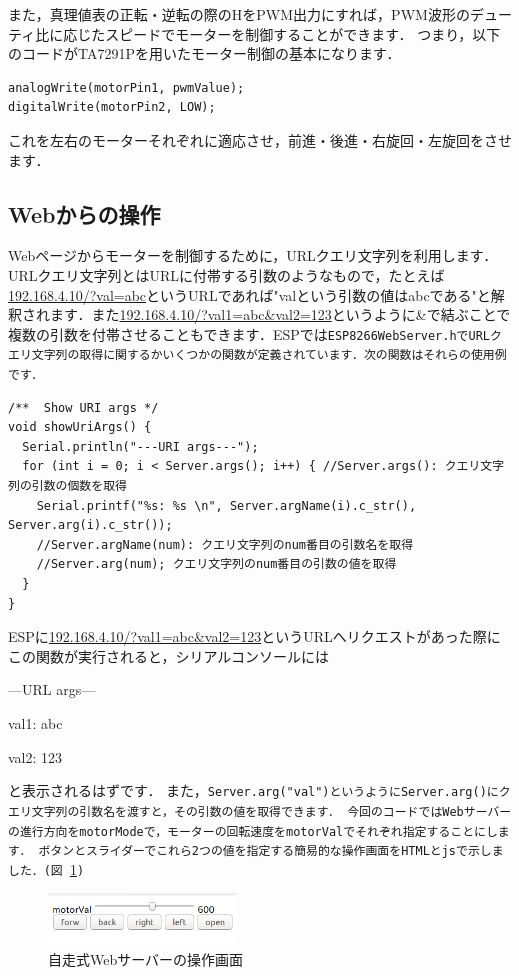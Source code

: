 また，真理値表の正転・逆転の際のHをPWM出力にすれば，PWM波形のデューティ比に応じたスピードでモーターを制御することができます．
つまり，以下のコードがTA7291Pを用いたモーター制御の基本になります．
\begin{verbatim}
analogWrite(motorPin1, pwmValue);
digitalWrite(motorPin2, LOW);
\end{verbatim}
これを左右のモーターそれぞれに適応させ，前進・後進・右旋回・左旋回をさせます．

\subsection{Webからの操作}
Webページからモーターを制御するために，URLクエリ文字列を利用します．URLクエリ文字列とはURLに付帯する引数のようなもので，たとえば\url{192.168.4.10/?val=abc}というURLであれば"valという引数の値はabcである"と解釈されます．また\url{192.168.4.10/?val1=abc&val2=123}というように\&で結ぶことで複数の引数を付帯させることもできます．ESPでは\tt{ESP8266WebServer.h}\rm{}でURLクエリ文字列の取得に関するかいくつかの関数が定義されています．次の関数はそれらの使用例です．
\begin{verbatim}
/**  Show URI args */
void showUriArgs() {
  Serial.println("---URI args---");
  for (int i = 0; i < Server.args(); i++) { //Server.args(): クエリ文字列の引数の個数を取得
    Serial.printf("%s: %s \n", Server.argName(i).c_str(), Server.arg(i).c_str()); 
    //Server.argName(num): クエリ文字列のnum番目の引数名を取得
    //Server.arg(num); クエリ文字列のnum番目の引数の値を取得
  }
}
\end{verbatim}
ESPに\url{192.168.4.10/?val1=abc&val2=123}というURLへリクエストがあった際にこの関数が実行されると，シリアルコンソールには
\tt{

---URL args---

val1: abc

val2: 123

}\rm{}
と表示されるはずです．
また，\tt{Server.arg("val")}\rm{}というように\tt{Server.arg()}\rm{}にクエリ文字列の引数名を渡すと，その引数の値を取得できます．
今回のコードではWebサーバーの進行方向をmotorModeで，モーターの回転速度をmotorValでそれぞれ指定することにします．
ボタンとスライダーでこれら2つの値を指定する簡易的な操作画面をHTMLとjsで示しました．(図 \ref{fig:html})

\begin{figure}[htbp]
    \centering
    \includegraphics[width=50mm]{./assets/haibaraaaaaaaasset/motorCtr.png}
    \caption{自走式Webサーバーの操作画面}
    \label{fig:html}
\end{figure}


